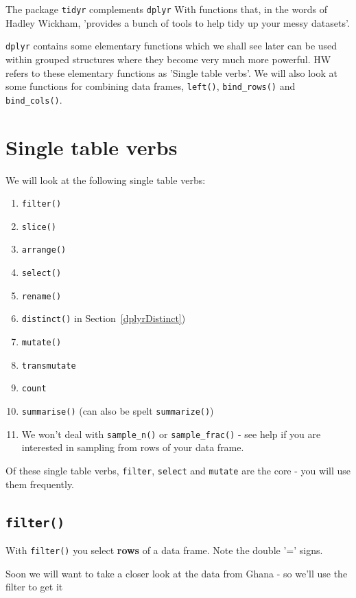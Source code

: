 \documentclass[titlepage]{book}\usepackage{knitr}
\begin{document}
The  package \texttt{tidyr} complements \texttt{dplyr} With functions that, in the words of Hadley Wickham, 'provides a bunch of tools to help tidy up your messy datasets'.

\texttt{dplyr} contains some elementary functions which we shall see later can be used within grouped structures where they become very much more powerful. HW refers to these elementary functions as 'Single table verbs'. We will also look at some functions for combining data frames, \texttt{left()}, \texttt{bind\_rows()} and \texttt{bind\_cols()}.

\section{Single table verbs}

We will look at the following single table verbs:
\begin{enumerate}
\item{\texttt{filter()}}
\item{\texttt{slice()}}
\item{\texttt{arrange()}}
\item{\texttt{select()}}
\item{\texttt{rename()}}
\item{\texttt{distinct()}} in Section~\ref{dplyrDistinct})
\item{\texttt{mutate()}}
\item{\texttt{transmutate}}
\item{\texttt{count}}
\item{\texttt{summarise()}} (can also be spelt \texttt{summarize()})
\item{ We won't deal with \texttt{sample\_n()} or \texttt{sample\_frac()} - see help if you are interested in sampling from rows of your data frame. }
\end{enumerate}

Of these single table verbs, \texttt{filter}, \texttt{select} and \texttt{mutate} are the core - you will use them frequently.


\subsection{\texttt{filter()}} 
With \texttt{filter()} you select \textbf{rows} of a data frame. Note the double '=' signs.
\begin{knitrout}
\color{fgcolor}\begin{kframe}
\begin{alltt}
 \hlkwb{<-}  \hlopt{==}  \hlstd{,}
                \hlopt{==} \hlopt{==}\hlstd{,}
               \hlopt{==} \hlstd{)}
\end{alltt}
\end{kframe}
\end{knitrout}
 Soon we will want to take a closer look at the data from Ghana - so we'll use the filter to get it
 
\end{document}
